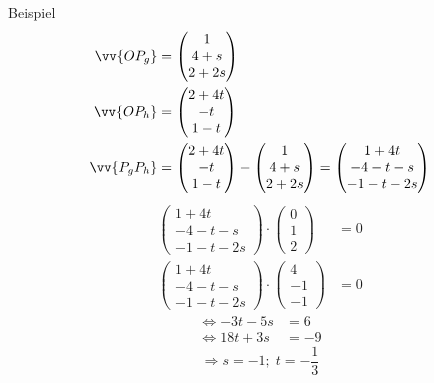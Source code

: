 \documentclass{article}
\begin{document}
\begin{boxx}[DarkBlue]{Beispiel}
    \begin{align*}
        \vv{OP_g} &= \begin{pmatrix}1\\4+s\\2+2s\end{pmatrix}\\
        \vv{OP_h} &= \begin{pmatrix}2+4t\\-t\\1-t\end{pmatrix}\\
        \vv{P_gP_h} &= \begin{pmatrix}2+4t\\-t\\1-t\end{pmatrix} - \begin{pmatrix}1\\4+s\\2+2s\end{pmatrix} = \begin{pmatrix}1+4t\\-4-t-s\\-1-t-2s\end{pmatrix}
    \end{align*}
    \begin{align}
        \begin{pmatrix}1+4t\\-4-t-s\\-1-t-2s\end{pmatrix} \cdot \begin{pmatrix}0\\1\\2\end{pmatrix} &= 0 \\
        \begin{pmatrix}1+4t\\-4-t-s\\-1-t-2s\end{pmatrix} \cdot \begin{pmatrix}4\\-1\\-1\end{pmatrix} &= 0
    \end{align}
    \begin{align}
        \Leftrightarrow -3t - 5s &= 6 \\
        \Leftrightarrow 18t + 3s &= -9 
    \end{align}
    \[\Rightarrow s=-1;\;t=-\frac{1}{3}\]
    \begin{align*}

\end{align*}
\end{boxx}
\end{document}
